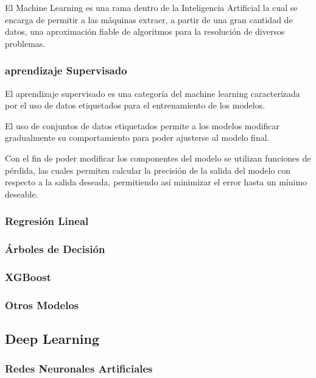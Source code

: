 \documentclass[a4paper,12pt]{article}
\begin{document}
El Machine Learning es una rama dentro de la Inteligencia
Artificial la cual se encarga de permitir a las máquinas 
extraer, a partir de una gran cantidad de datos, una 
aproximación fiable de algoritmos para la resolución de 
diversos problemas.

\subsubsection{aprendizaje Supervisado}


El aprendizaje supervisado es una categoría del machine
learning caracterizada por el uso de datos etiquetados 
para el entrenamiento de los modelos.

El uso de conjuntos de datos etiquetados permite a los
modelos modificar gradualmente su comportamiento para
poder ajusterse al modelo final.

Con el fin de poder modificar los componentes del modelo
se utilizan funciones de pérdida, las cuales permiten
calcular la precisión de la salida del modelo con respecto
a la salida deseada, permitiendo así minimizar el error
hasta un mínimo deseable.

\subsubsection{Regresión Lineal}

\subsubsection{Árboles de Decisión}

\subsubsection{XGBoost}

\subsubsection{Otros Modelos}


\subsection{Deep Learning}

\subsubsection{Redes Neuronales Artificiales}   
\end{document}
